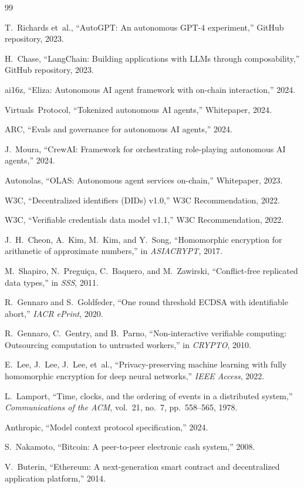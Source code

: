 \begin{thebibliography}{99}

T.~Richards et~al., ``AutoGPT: An autonomous GPT-4 experiment,'' GitHub repository, 2023.

H.~Chase, ``LangChain: Building applications with LLMs through composability,'' GitHub repository, 2023.

ai16z, ``Eliza: Autonomous AI agent framework with on-chain interaction,'' 2024.

Virtuals~Protocol, ``Tokenized autonomous AI agents,'' Whitepaper, 2024.

ARC, ``Evals and governance for autonomous AI agents,'' 2024.

J.~Moura, ``CrewAI: Framework for orchestrating role-playing autonomous AI agents,'' 2024.

Autonolas, ``OLAS: Autonomous agent services on-chain,'' Whitepaper, 2023.

W3C, ``Decentralized identifiers (DIDs) v1.0,'' W3C Recommendation, 2022.

W3C, ``Verifiable credentials data model v1.1,'' W3C Recommendation, 2022.

J.~H.~Cheon, A.~Kim, M.~Kim, and Y.~Song, ``Homomorphic encryption for arithmetic of approximate numbers,'' in \emph{ASIACRYPT}, 2017.

M.~Shapiro, N.~Pregui\c{c}a, C.~Baquero, and M.~Zawirski, ``Conflict-free replicated data types,'' in \emph{SSS}, 2011.

R.~Gennaro and S.~Goldfeder, ``One round threshold ECDSA with identifiable abort,'' \emph{IACR ePrint}, 2020.

R.~Gennaro, C.~Gentry, and B.~Parno, ``Non-interactive verifiable computing: Outsourcing computation to untrusted workers,'' in \emph{CRYPTO}, 2010.

E.~Lee, J.~Lee, J.~Lee, et~al., ``Privacy-preserving machine learning with fully homomorphic encryption for deep neural networks,'' \emph{IEEE Access}, 2022.

L.~Lamport, ``Time, clocks, and the ordering of events in a distributed system,'' \emph{Communications of the ACM}, vol.~21, no.~7, pp.~558--565, 1978.

Anthropic, ``Model context protocol specification,'' 2024.

S.~Nakamoto, ``Bitcoin: A peer-to-peer electronic cash system,'' 2008.

V.~Buterin, ``Ethereum: A next-generation smart contract and decentralized application platform,'' 2014.

\end{thebibliography}

